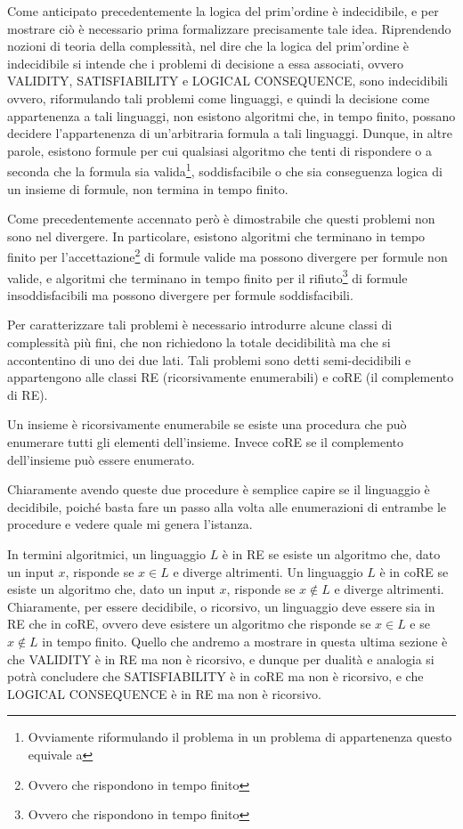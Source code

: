 Come anticipato precedentemente la logica del prim'ordine è indecidibile, e per mostrare ciò è necessario prima formalizzare precisamente tale idea. Riprendendo nozioni di teoria della complessità, nel dire che la logica del prim'ordine è indecidibile si intende che i problemi di decisione a essa associati, ovvero VALIDITY, SATISFIABILITY e LOGICAL CONSEQUENCE, sono indecidibili ovvero, riformulando tali problemi come linguaggi, e quindi la decisione come appartenenza a tali linguaggi, non esistono algoritmi che, in tempo finito, possano decidere l'appartenenza di un'arbitraria formula a tali linguaggi. Dunque, in altre parole, esistono formule per cui qualsiasi algoritmo che tenti di rispondere  o  a seconda che la formula sia valida\footnote{Ovviamente riformulando il problema in un problema di appartenenza questo equivale a }, soddisfacibile o che sia conseguenza logica di un insieme di formule, non termina in tempo finito.

Come precedentemente accennato però è dimostrabile che questi problemi non sono  nel divergere. In particolare, esistono algoritmi che terminano in tempo finito per l'accettazione\footnote{Ovvero che rispondono  in tempo finito} di formule valide ma possono divergere per formule non valide, e algoritmi che terminano in tempo finito per il rifiuto\footnote{Ovvero che rispondono  in tempo finito} di formule insoddisfacibili ma possono divergere per formule soddisfacibili. 

Per caratterizzare tali problemi è necessario introdurre alcune classi di complessità più fini, che non richiedono la totale decidibilità ma che si accontentino di uno dei due lati. Tali problemi sono detti semi-decidibili e appartengono alle classi RE (ricorsivamente enumerabili) e coRE (il complemento di RE).

Un insieme è ricorsivamente enumerabile se esiste una procedura che può enumerare tutti gli elementi dell'insieme. Invece coRE se il complemento dell'insieme può essere enumerato. 

Chiaramente avendo queste due procedure è semplice capire se il linguaggio è decidibile, poiché basta fare un passo alla volta alle enumerazioni di entrambe le procedure e vedere quale mi genera l'istanza.

In termini algoritmici, un linguaggio \(L\) è in RE se esiste un algoritmo che, dato un input \(x\), risponde  se \(x \in L\) e diverge altrimenti. Un linguaggio \(L\) è in coRE se esiste un algoritmo che, dato un input \(x\), risponde  se \(x \not\in L\) e diverge altrimenti. Chiaramente, per essere decidibile, o ricorsivo, un linguaggio deve essere sia in RE che in coRE, ovvero deve esistere un algoritmo che risponde  se \(x \in L\) e  se \(x \not\in L\) in tempo finito. Quello che andremo a mostrare in questa ultima sezione è che VALIDITY è in RE ma non è ricorsivo, e dunque per dualità e analogia si potrà concludere che SATISFIABILITY è in coRE ma non è ricorsivo, e che LOGICAL CONSEQUENCE è in RE ma non è ricorsivo.

